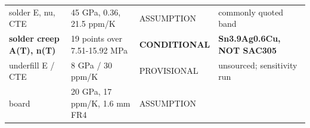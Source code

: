 \documentclass[10pt,]{article}
\begin{document}
\begin{longtable}[]{@{}llll@{}}
\begin{minipage}[t]{0.22\columnwidth}
solder E, nu, CTE\strut
\end{minipage} & \begin{minipage}[t]{0.22\columnwidth}\raggedright
45 GPa, 0.36, 21.5 ppm/K\strut
\end{minipage} & \begin{minipage}[t]{0.22\columnwidth}\raggedright
ASSUMPTION\strut
\end{minipage} & \begin{minipage}[t]{0.22\columnwidth}\raggedright
commonly quoted band\strut
\end{minipage}\tabularnewline
\begin{minipage}[t]{0.22\columnwidth}\raggedright
\textbf{solder creep A(T), n(T)}\strut
\end{minipage} & \begin{minipage}[t]{0.22\columnwidth}\raggedright
19 points over 7.51-15.92 MPa\strut
\end{minipage} & \begin{minipage}[t]{0.22\columnwidth}\raggedright
\textbf{CONDITIONAL}\strut
\end{minipage} & \begin{minipage}[t]{0.22\columnwidth}\raggedright
\textbf{Sn3.9Ag0.6Cu, NOT SAC305}\strut
\end{minipage}\tabularnewline
\begin{minipage}[t]{0.22\columnwidth}\raggedright
underfill E / CTE\strut
\end{minipage} & \begin{minipage}[t]{0.22\columnwidth}\raggedright
8 GPa / 30 ppm/K\strut
\end{minipage} & \begin{minipage}[t]{0.22\columnwidth}\raggedright
PROVISIONAL\strut
\end{minipage} & \begin{minipage}[t]{0.22\columnwidth}\raggedright
unsourced; sensitivity run\strut
\end{minipage}\tabularnewline
\begin{minipage}[t]{0.22\columnwidth}\raggedright
board\strut
\end{minipage} & \begin{minipage}[t]{0.22\columnwidth}\raggedright
20 GPa, 17 ppm/K, 1.6 mm FR4\strut
\end{minipage} & \begin{minipage}[t]{0.22\columnwidth}\raggedright
ASSUMPTION\strut
\end{minipage} & \begin{minipage}[t]{0.22\columnwidth}\raggedright

\end{minipage}
\end{longtable}
\end{document}

